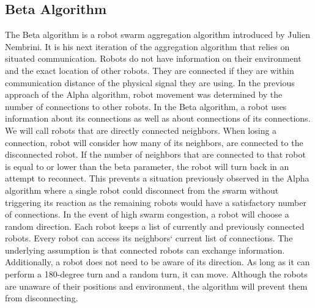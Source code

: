 \newpage
\subsection{Beta Algorithm}
The Beta algorithm is a robot swarm aggregation algorithm introduced by Julien Nembrini. It is his next iteration of the aggregation algorithm that relies on situated communication. Robots do not have information on their environment and the exact location of other robots. They are connected if they are within communication distance of the physical signal they are using. In the previous approach of the Alpha algorithm, robot movement was determined by the number of connections to other robots. In the Beta algorithm, a robot uses information about its connections as well as about connections of its connections. We will call robots that are directly connected neighbors. When losing a connection, robot will consider how many of its neighbors, are connected to the disconnected robot. If the number of neighbors that are connected to that robot is equal to or lower than the beta parameter, the robot will turn back in an attempt to reconnect. This prevents a situation previously observed in the Alpha algorithm where a single robot could disconnect from the swarm without triggering its reaction as the remaining robots would have a satisfactory number of connections. In the event of high swarm congestion, a robot will choose a random direction. Each robot keeps a list of currently and previously connected robots. Every robot can access its neighbors` current list of connections. The underlying assumption is that connected robots can exchange information. Additionally, a robot does not need to be aware of its direction. As long as it can perform a 180-degree turn and a random turn, it can move. Although the robots are unaware of their positions and environment, the algorithm will prevent them from disconnecting.

